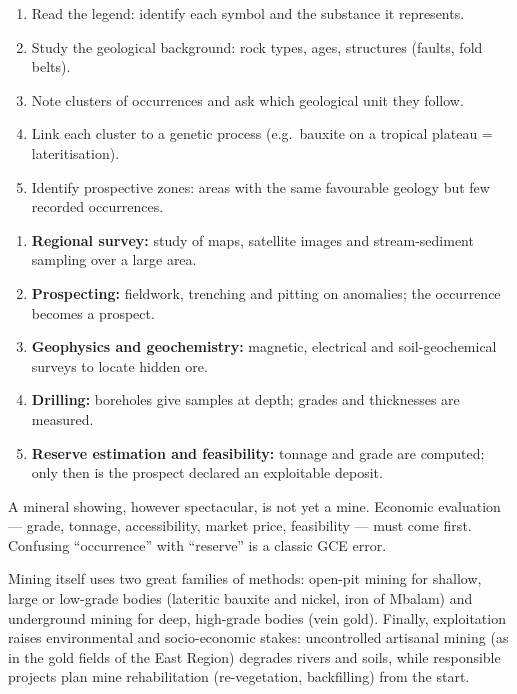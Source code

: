 \documentclass[11pt]{article}
\newcommand{\cle}[1]{{\popxbold\color{popdark}#1}}
\newcounter{popsec}
\newcounter{popsub}
\newcommand{\courssub}[1]{%
  \stepcounter{popsub}%
  \par\vspace{9pt}\noindent{\popxbold\fontsize{11.5}{13}\selectfont\color{popink}{\color{poporange}\thepopsec.\thepopsub}\hspace{6pt}#1}\par\nopagebreak\vspace{4pt}
}
\begin{document}
\begin{methode}
\begin{enumerate}
\item Read the legend: identify each symbol and the substance it represents.
\item Study the geological background: rock types, ages, structures (faults, fold belts).
\item Note clusters of occurrences and ask which geological unit they follow.
\item Link each cluster to a genetic process (e.g.\ bauxite on a tropical plateau = lateritisation).
\item Identify \cle{prospective zones}: areas with the same favourable geology but few recorded occurrences.
\end{enumerate}
\end{methode}

\courssub{From Occurrence to Exploitation}

\begin{methode}
\begin{enumerate}
\item \textbf{Regional survey:} study of maps, satellite images and stream-sediment sampling over a large area.
\item \textbf{Prospecting:} fieldwork, trenching and pitting on anomalies; the occurrence becomes a prospect.
\item \textbf{Geophysics and geochemistry:} magnetic, electrical and soil-geochemical surveys to locate hidden ore.
\item \textbf{Drilling:} boreholes give samples at depth; grades and thicknesses are measured.
\item \textbf{Reserve estimation and feasibility:} tonnage and grade are computed; only then is the prospect declared an exploitable \cle{deposit}.
\end{enumerate}
\end{methode}

\begin{attention}
A mineral showing, however spectacular, is not yet a mine. Economic evaluation --- \cle{grade}, \cle{tonnage}, accessibility, market price, feasibility --- must come first. Confusing ``occurrence'' with ``reserve'' is a classic GCE error.
\end{attention}

Mining itself uses two great families of methods: \cle{open-pit} mining for shallow, large or low-grade bodies (lateritic bauxite and nickel, iron of Mbalam) and \cle{underground} mining for deep, high-grade bodies (vein gold). Finally, exploitation raises environmental and socio-economic stakes: uncontrolled \cle{artisanal mining} (as in the gold fields of the East Region) degrades rivers and soils, while responsible projects plan \cle{mine rehabilitation} (re-vegetation, backfilling) from the start.
\end{document}
